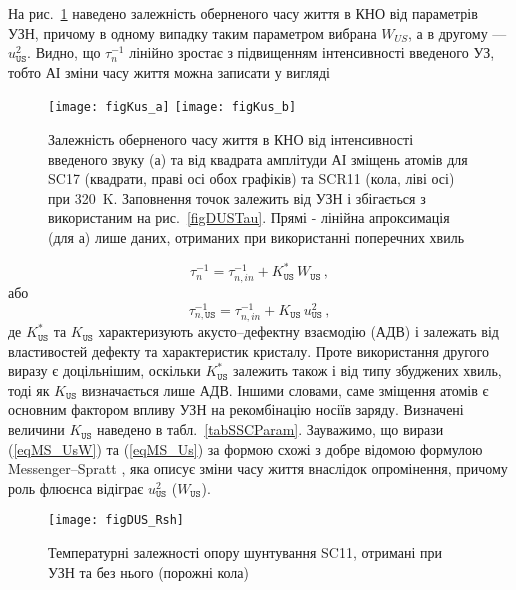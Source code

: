 На рис.~\ref{figKus} наведено залежність оберненого часу життя в КНО від параметрів УЗН,
причому в одному випадку таким параметром вибрана $W_{U\!S}$, а в другому --- $u_\mathtt{US}^2$.
Видно, що $\tau_n^{-1}$ лінійно зростає з підвищенням інтенсивності введеного УЗ,
тобто АІ зміни часу життя можна записати у вигляді

\begin{figure}
\center
\texttt{[image: figKus\_a]} \hfill
\texttt{[image: figKus\_b]}
\caption{\label{figKus}
Залежність оберненого часу життя в КНО від інтенсивності введеного звуку (а)
та від квадрата амплітуди АІ зміщень атомів для SC17 (квадрати, праві осі обох графіків)
та SCR11 (кола, ліві осі) при 320~K.
Заповнення точок залежить від УЗН і збігається з використаним на рис.~\ref{figDUSTau}.
Прямі - лінійна апроксимація (для а) лише даних, отриманих при використанні поперечних хвиль
}%
\end{figure}

\begin{equation}
\label{eqMS_UsW}
\tau_n^{-1}=\tau_{n,in}^{-1}+K_\mathtt{US}^{*}\,W_\mathtt{US}\,,
\end{equation}
або
\begin{equation}
\label{eqMS_Us}
\tau_{n,\mathtt{US}}^{-1}=\tau_{n,in}^{-1}+K_\mathtt{US}\,u_\mathtt{US}^2 \,,
\end{equation}
де $K_\mathtt{US}^{*}$ та $K_\mathtt{US}$ характеризують акусто--дефектну взаємодію (АДВ) і залежать від властивостей дефекту та характеристик кристалу.
Проте використання  другого виразу є доцільнішим, оскільки $K_\mathtt{US}^{*}$ залежить також і від типу збуджених хвиль,
тоді як $K_\mathtt{US}$ визначається лише АДВ.
Іншими словами, саме зміщення атомів є основним фактором впливу УЗН на рекомбінацію носіїв заряду.
Визначені величини $K_\mathtt{US}$ наведено в табл.~\ref{tabSSCParam}.
Зауважимо, що вирази (\ref{eqMS_UsW}) та (\ref{eqMS_Us}) за формою схожі з добре відомою формулою Messenger--Spratt \cite{Markvart},
яка описує зміни часу життя внаслідок опромінення, причому роль флюєнса відіграє $u_\mathtt{US}^2$ ($W_\mathtt{US}$).



\begin{figure}
\center
\texttt{[image: figDUS\_Rsh]}%
\caption{\label{figDUS_Rsh}
Температурні залежності  опору шунтування SC11, отримані при УЗН та без нього (порожні кола)
}%
\end{figure}


